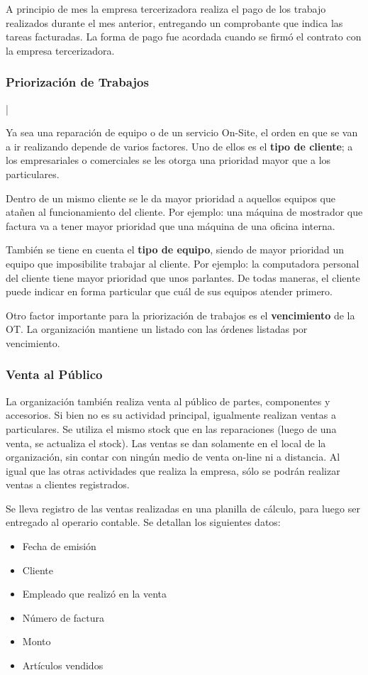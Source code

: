 \documentclass[12pt]{extarticle}
\begin{document}
\begin{spacing}{1.2}
    A principio de mes la empresa tercerizadora realiza el pago de los trabajo realizados durante el mes anterior, entregando un comprobante que indica las tareas facturadas. La forma de pago fue acordada cuando se firmó el contrato con la empresa tercerizadora.

    \subsubsection*{Priorización de Trabajos}|

    Ya sea una reparación de equipo o de un servicio On-Site, el orden en que se van a ir realizando depende de varios factores. Uno de ellos es el \textbf{tipo de cliente}; a los empresariales o comerciales se les otorga una prioridad mayor que a los particulares.

    Dentro de un mismo cliente se le da mayor prioridad a aquellos equipos que atañen al funcionamiento del cliente. Por ejemplo: una máquina de mostrador que factura va a tener mayor prioridad que una máquina de una oficina interna.

    También se tiene en cuenta el \textbf{tipo de equipo}, siendo de mayor prioridad un equipo que imposibilite trabajar al cliente. Por ejemplo: la computadora personal del cliente tiene mayor prioridad que unos parlantes.
    De todas maneras, el cliente puede indicar en forma particular que cuál de sus equipos atender primero.

    Otro factor importante para la priorización de trabajos es el \textbf{vencimiento} de la OT. La organización mantiene un listado con las órdenes listadas por vencimiento.

    \subsubsection{Venta al Público}
    La organización también realiza venta al público de partes, componentes y accesorios. Si bien no es su actividad principal, igualmente realizan ventas a particulares. Se utiliza el mismo stock que en las reparaciones (luego de una venta, se actualiza el stock). 
    Las ventas se dan solamente en el local de la organización, sin contar con ningún medio de venta on-line ni a distancia. Al igual que las otras actividades que realiza la empresa, sólo se podrán realizar ventas a clientes registrados.

    Se lleva registro de las ventas realizadas en una planilla de cálculo, para luego ser entregado al operario contable. Se detallan los siguientes datos:
    \begin{itemize}
        \item Fecha de emisión
        \item Cliente
        \item Empleado que realizó en la venta
        \item Número de factura
        \item Monto
        \item Artículos vendidos
    \end{itemize}


\end{spacing}
\end{document}
